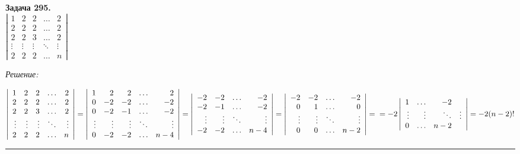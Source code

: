 \documentclass[a4paper, 12pt]{article}
\newenvironment{problem}[2][Задача]
    { \begin{mdframed}[backgroundcolor=gray!10] \textbf{#1 #2.} \\}
    {  \end{mdframed}}
\newenvironment{solution}
    {\textit{Решение: }}
    {\noindent\rule{7in}{1.5pt}}
\begin{document}
\begin{problem}{295}
$\left| \begin{array}{rrrrr}1 & 2 & 2 & \ldots & 2\\ 2 & 2 & 2 & \ldots & 2 \\ 2 & 2 & 3 & \ldots & 2 \\ \vdots & \vdots & \vdots & \ddots & \vdots \\ 2 & 2 & 2 & \ldots & n \end{array} \right|$
\end{problem}
\begin{solution}

$
\left|
\begin{array}{rrrrr}
1 & 2 & 2 & \ldots & 2 \\
2 & 2 & 2 & \ldots & 2 \\
2 & 2 & 3 & \ldots & 2 \\
\vdots & \vdots & \vdots & \ddots & \vdots \\
2 & 2 & 2 & \ldots & n
\end{array}
\right|
=
\left|
\begin{array}{rrrrr}
1 & 2 & 2 & \ldots & 2 \\
0 & -2 & -2 & \ldots & -2 \\
0 & -2 & -1 & \ldots & -2 \\
\vdots & \vdots & \vdots & \ddots & \vdots \\
0 & -2 & -2 & \ldots & n - 4
\end{array}
\right|
=
\left|
\begin{array}{rrrrr}
-2 & -2 & \ldots & -2 \\
-2 & -1 & \ldots & -2 \\
\vdots & \vdots & \ddots & \vdots \\
-2 & -2 & \ldots & n - 4
\end{array}
\right|
=
\left|
\begin{array}{rrrrr}
-2 & -2 & \ldots & -2 \\
0 & 1 & \ldots & 0 \\
\vdots & \vdots & \ddots & \vdots \\
0 & 0 & \ldots & n - 2
\end{array}
\right|
= \\
= -2
\left|
\begin{array}{rrrrr}
1 & \ldots & -2 \\
\vdots & \vdots & \ddots & \vdots \\
0 & \ldots & n - 2
\end{array}
\right|
= -2(n-2)!
$

\end{solution}
\end{document}
